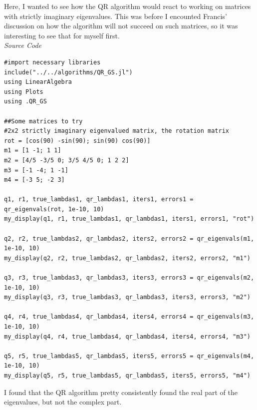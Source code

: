 \documentclass[onecolumn]{webofc}
\begin{document}
Here, I wanted to see how the QR algorithm would react to working on matrices with strictly imaginary eigenvalues. This was before I encounted Francis' discussion on how the algorithm will not succeed on such matrices, so it was interesting to see that for myself first.
\\

\textit{Source Code}
\begin{lstlisting}
#import necessary libraries
include("../../algorithms/QR_GS.jl")
using LinearAlgebra
using Plots
using .QR_GS

##Some matrices to try
#2x2 strictly imaginary eigenvalued matrix, the rotation matrix
rot = [cos(90) -sin(90); sin(90) cos(90)]
m1 = [1 -1; 1 1]
m2 = [4/5 -3/5 0; 3/5 4/5 0; 1 2 2]
m3 = [-1 -4; 1 -1]
m4 = [-3 5; -2 3]

q1, r1, true_lambdas1, qr_lambdas1, iters1, errors1 = qr_eigenvals(rot, 1e-10, 10)
my_display(q1, r1, true_lambdas1, qr_lambdas1, iters1, errors1, "rot")

q2, r2, true_lambdas2, qr_lambdas2, iters2, errors2 = qr_eigenvals(m1, 1e-10, 10)
my_display(q2, r2, true_lambdas2, qr_lambdas2, iters2, errors2, "m1")

q3, r3, true_lambdas3, qr_lambdas3, iters3, errors3 = qr_eigenvals(m2, 1e-10, 10)
my_display(q3, r3, true_lambdas3, qr_lambdas3, iters3, errors3, "m2")

q4, r4, true_lambdas4, qr_lambdas4, iters4, errors4 = qr_eigenvals(m3, 1e-10, 10)
my_display(q4, r4, true_lambdas4, qr_lambdas4, iters4, errors4, "m3")

q5, r5, true_lambdas5, qr_lambdas5, iters5, errors5 = qr_eigenvals(m4, 1e-10, 10)
my_display(q5, r5, true_lambdas5, qr_lambdas5, iters5, errors5, "m4")
\end{lstlisting}

I found that the QR algorithm pretty consistently found the real part of the eigenvalues, but not the complex part.
\end{document}
